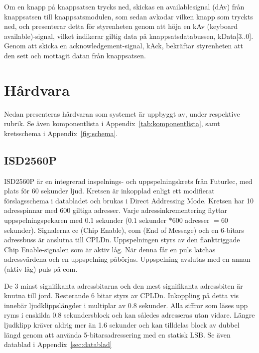 \documentclass[a4paper,11pt]{article}
\begin{document}
Om en knapp på knappsatsen trycks ned, skickas en availablesignal (dAv) från knappsatsen till knappsatsmodulen, som sedan
avkodar vilken knapp som tryckts ned, och presenterar detta för styrenheten genom att höja en kAv (keyboard available)-signal,
vilket indikerar giltig data på knappsatsdatabussen, kData[3..0]. Genom att skicka en acknowledgement-signal, kAck, bekräftar 
styrenheten att den sett och mottagit datan från knappsatsen.

\section{Hårdvara}

Nedan presenteras hårdvaran som systemet är uppbyggt av, under respektive rubrik. Se även komponentlista i Appendix~\ref{tab:komponentlista},
samt kretsschema i Appendix~\ref{fig:schema}.

\label{hårdvara}
	\subsection{ISD2560P}
ISD2560P är en integrerad inspelnings- och uppspelningskrets från Futurlec, med plats för 60 sekunder ljud. Kretsen är inkopplad enligt ett modifierat förslagsschema i databladet och brukas i Direct Addressing Mode. Kretsen har 10 adresspinnar med 600 giltiga adresser. Varje adressinkrementering flyttar uppspelningspekaren med 0.1 sekunder ($0.1 $ sekunder $* 600$ adresser $= 60$ sekunder). Signalerna ce (Chip Enable), eom (End of Message) och en 6-bitars adressbuss är anslutna till CPLDn. Uppspelningen styrs av den flanktriggade Chip Enable-signalen som är aktiv låg. När denna får en puls latchas adressvärdena och en uppspelning påbörjas. Uppspelning avslutas med en annan (aktiv låg) puls på eom.

De 3 minst signifikanta adressbitarna och den mest signifikanta adressbiten är knutna till jord. Resterande 6 bitar styrs av CPLDn. Inkoppling på detta vis innebär ljudklippslängder i multiplar av 0.8 sekunder. Alla siffror som läses upp ryms i enskilda 0.8 sekundersblock och kan således adresseras utan vidare. Längre ljudklipp kräver aldrig mer än 1.6 sekunder och kan tilldelas block av dubbel längd genom att använda 5-bitarsadressering med en statisk LSB.
	Se även datablad i Appendix~\ref{sec:datablad}
\end{document}
